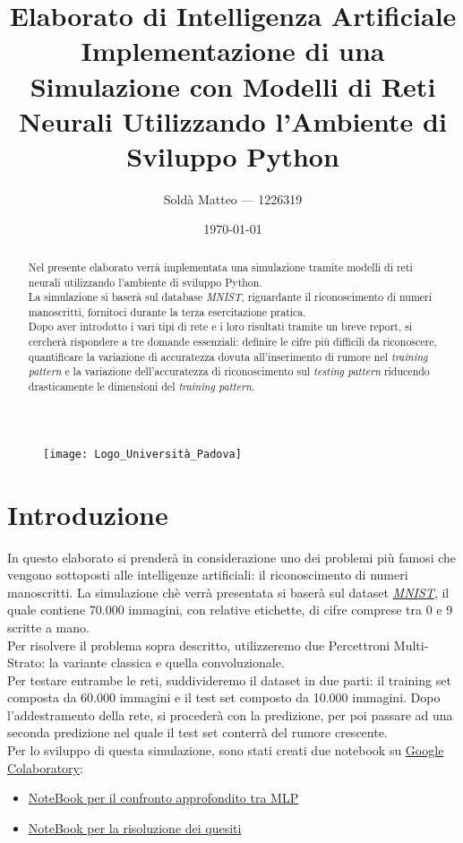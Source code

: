 \documentclass[12pt, a4paper]{article}
\title{\textbf{Elaborato di Intelligenza Artificiale} \\ Implementazione di una Simulazione con Modelli di Reti Neurali Utilizzando l'Ambiente di Sviluppo Python}
\author{Soldà Matteo --- 1226319}
\date{\today}
\begin{document}
\begin{figure}
    \centering
    \texttt{[image: Logo\_Università\_Padova]}
\end{figure}

\maketitle

\newpage
\begin{abstract}
Nel presente elaborato verrà implementata una simulazione tramite modelli di reti neurali utilizzando l'ambiente di sviluppo Python.\\
La simulazione si baserà sul database \textit{MNIST}, riguardante il riconoscimento di numeri manoscritti, fornitoci durante la terza esercitazione pratica.\\
Dopo aver introdotto i vari tipi di rete e i loro risultati tramite un breve report, si cercherà rispondere a tre domande essenziali: definire le cifre più difficili da riconoscere, quantificare la variazione di accuratezza dovuta all'inserimento di rumore nel \textit{training pattern} e la variazione dell'accuratezza di riconoscimento sul \textit{testing pattern} riducendo drasticamente le dimensioni del \textit{training pattern}.    
\end{abstract}

\newpage
\tableofcontents

\newpage
\section{Introduzione}
In questo elaborato si prenderà in considerazione uno dei problemi più famosi che vengono sottoposti alle intelligenze artificiali: il riconoscimento di numeri manoscritti.
La simulazione chè verrà presentata si baserà sul dataset \href{http://yann.lecun.com/exdb/mnist/}{\textit{MNIST}}, il quale contiene 70.000 immagini, con relative etichette, di cifre comprese tra 0 e 9 scritte a mano.\\
Per risolvere il problema sopra descritto, utilizzeremo due Percettroni Multi-Strato: la variante classica e quella convoluzionale.\\
Per testare entrambe le reti, suddivideremo il dataset in due parti: il training set composta da 60.000 immagini e il test set composto da 10.000 immagini. Dopo l'addestramento della rete, si procederà con la predizione, per poi passare ad una seconda predizione nel quale il test set conterrà del rumore crescente.\\
Per lo sviluppo di questa simulazione, sono stati creati due notebook su \href{https://colab.research.google.com/?utm_source=scs-index}{Google Colaboratory}:
\begin{itemize}
    \item \href{https://colab.research.google.com/drive/1e4vY_9wn6-ugL5NivZc0RBluGdfWqTUM?usp=sharing}{NoteBook per il confronto approfondito tra MLP}
    \item \href{https://colab.research.google.com/drive/1v2dkWKelr-q5CTpsDUDqp55PUqiId64F?usp=sharing}{NoteBook per la risoluzione dei quesiti}
\end{itemize}
\end{document}
